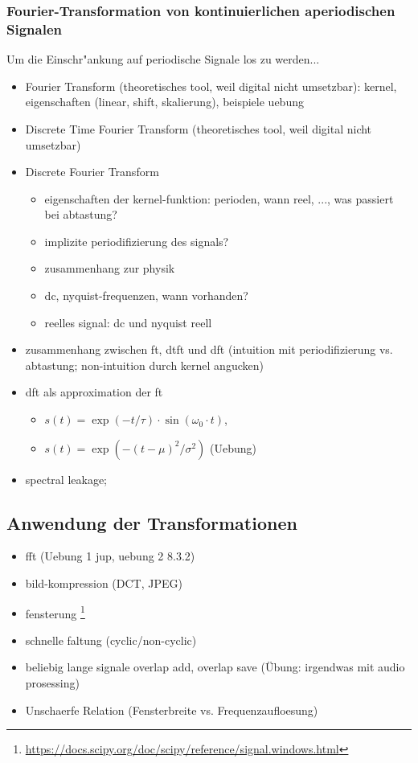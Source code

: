 \subsubsection{Fourier-Transformation von kontinuierlichen aperiodischen Signalen}
%
Um die Einschr"ankung auf periodische Signale los zu werden...
\begin{itemize}
    \item Fourier Transform (theoretisches tool, weil digital nicht umsetzbar): kernel, eigenschaften (linear, shift, skalierung), beispiele uebung 
    \item Discrete Time Fourier Transform (theoretisches tool, weil digital nicht umsetzbar)
    \item Discrete Fourier Transform
    \begin{itemize}
        \item eigenschaften der kernel-funktion: perioden, wann reel, ..., was passiert bei abtastung?
        \item implizite periodifizierung des signals?
        \item zusammenhang zur physik
        \item dc, nyquist-frequenzen, wann vorhanden?
        \item reelles signal: dc und nyquist reell
    \end{itemize}
    \item zusammenhang zwischen ft, dtft und dft (intuition mit periodifizierung vs. abtastung; non-intuition durch kernel angucken)
    \item dft als approximation der ft
    \begin{itemize}
        \item $s(t) = \exp(-t/\tau) \cdot \sin(\omega_0 \cdot t)$, 
        \item $s(t) = \exp(-(t - \mu)^2/\sigma^2)$ (Uebung)
    \end{itemize}
    \item spectral leakage;
\end{itemize}
\subsection{Anwendung der Transformationen}
\begin{itemize}
    \item fft (Uebung 1 jup, uebung 2 8.3.2)
    \item bild-kompression (DCT, JPEG)
    \item fensterung \footnote{\url{https://docs.scipy.org/doc/scipy/reference/signal.windows.html}}
    \item schnelle faltung (cyclic/non-cyclic)
    \item beliebig lange signale overlap add, overlap save (\"Ubung: irgendwas mit audio prosessing)
    \item Unschaerfe Relation (Fensterbreite vs. Frequenzaufloesung)\cite[chpt. 4.2]{mallat2008wavelets}
\end{itemize}
